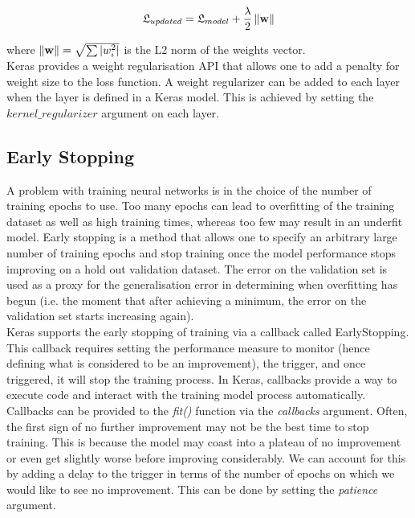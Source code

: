 \begin{equation}
  \centering
  \mathfrak{L}_{updated} = \mathfrak{L}_{model} + \frac{\lambda}{2} \norm{\textbf{w}}
\end{equation}

where $\left\lVert\textbf{w}\right\rVert = \sqrt{\sum |w_i^2|}$ is the L2 norm of the weights vector.\\

Keras provides a weight regularisation API that allows one to add a penalty for weight size to the loss function. A weight regularizer can be added to each layer when the layer is defined in a Keras model. This is achieved by setting the $kernel\_regularizer$ argument on each layer.

\subsection{Early Stopping}
A problem with training neural networks is in the choice of the number of training epochs to use. Too many epochs can lead to overfitting of the training dataset as well as high training times, whereas too few may result in an underfit model. Early stopping is a method that allows one to specify an arbitrary large number of training epochs and stop training once the model performance stops improving on a hold out validation dataset. The error on the validation set is used as a proxy for the generalisation error in determining when overfitting has begun (i.e. the moment that after achieving a minimum, the error on the validation set starts increasing again).\\

Keras supports the early stopping of training via a callback called EarlyStopping. This callback requires setting the performance measure to monitor (hence defining what is considered to be an improvement), the trigger, and once triggered, it will stop the training process. In Keras, callbacks provide a way to execute code and interact with the training model process automatically. Callbacks can be provided to the \textit{fit()} function via the \textit{callbacks} argument. Often, the first sign of no further improvement may not be the best time to stop training. This is because the model may coast into a plateau of no improvement or even get slightly worse before improving considerably. We can account for this by adding a delay to the trigger in terms of the number of epochs on which we would like to see no improvement. This can be done by setting the \textit{patience} argument. \\

